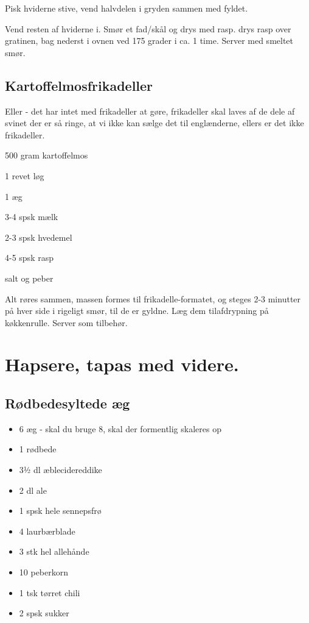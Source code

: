 \documentclass[
]{book}
\providecommand{\tightlist}{%
  \setlength{\itemsep}{0pt}\setlength{\parskip}{0pt}}
\begin{document}
Pisk hviderne stive, vend halvdelen i gryden sammen med fyldet.

Vend resten af hviderne i. Smør et fad/skål
og drys med rasp. drys rasp over gratinen, bag nederst i ovnen
ved 175 grader i ca. 1 time. Server med smeltet smør.

\hypertarget{kartoffelmosfrikadeller}{%
\section{Kartoffelmosfrikadeller}\label{kartoffelmosfrikadeller}}

Eller - det har intet med frikadeller at gøre, frikadeller skal laves af de dele af svinet der er så ringe, at vi ikke kan sælge det til englænderne, ellers er det ikke frikadeller.

500 gram kartoffelmos

1 revet løg

1 æg

3-4 spsk mælk

2-3 spsk hvedemel

4-5 spsk rasp

salt og peber

Alt røres sammen, massen formes til frikadelle-formatet, og steges 2-3 minutter på hver side i rigeligt smør, til de er gyldne. Læg dem tilafdrypning på køkkenrulle. Server som tilbehør.

\hypertarget{hapsere-tapas-med-videre.}{%
\chapter{Hapsere, tapas med videre.}\label{hapsere-tapas-med-videre.}}

\hypertarget{ruxf8dbedesyltede-uxe6g}{%
\section{Rødbedesyltede æg}\label{ruxf8dbedesyltede-uxe6g}}

\begin{itemize}
\tightlist
\item
  6 æg - skal du bruge 8, skal der formentlig skaleres op
\item
  1 rødbede
\item
  3½ dl æblecidereddike
\item
  2 dl ale
\item
  1 spsk hele sennepsfrø
\item
  4 laurbærblade
\item
  3 stk hel allehånde
\item
  10 peberkorn
\item
  1 tsk tørret chili
\item
  2 spsk sukker
\end{itemize}
\end{document}
